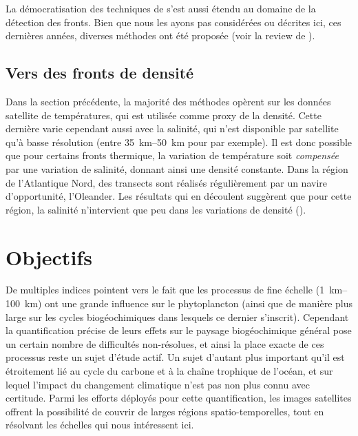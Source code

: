 \begin{note}
  La démocratisation des techniques de  s'est aussi étendu au domaine de la détection des fronts.
  Bien que nous les ayons pas considérées ou décrites ici, ces dernières années, diverses méthodes ont été proposée (voir la review de \cite{liu_2022}).
\end{note}

\subsection{Vers des fronts de densité}

Dans la section précédente, la majorité des méthodes opèrent sur les données satellite de températures, qui est utilisée comme proxy de la densité.
Cette dernière varie cependant aussi avec la salinité, qui n'est disponible par satellite qu'à basse résolution (entre \qtyrange[range-phrase={ et }]{35}{50}{\km} pour  par exemple).
Il est donc possible que pour certains fronts thermique, la variation de température soit \emph{compensée} par une variation de salinité, donnant ainsi une densité constante.
Dans la région de l'Atlantique Nord, des transects sont réalisés régulièrement par un navire d'opportunité, l'Oleander.
Les résultats qui en découlent suggèrent que pour cette région, la salinité n'intervient que peu dans les variations de densité (\cite{flagg_2006}).


\section{Objectifs}
\label{sec:problematique}

De multiples indices pointent vers le fait que les processus de fine échelle \OM(\qtyrange{1}{100}{\km}) ont une grande influence sur le phytoplancton (ainsi que de manière plus large sur les cycles biogéochimiques dans lesquels ce dernier s'inscrit).
Cependant la quantification précise de leurs effets sur le paysage biogéochimique général pose un certain nombre de difficultés non-résolues, et ainsi la place exacte de ces processus reste un sujet d'étude actif.
Un sujet d'autant plus important qu'il est étroitement lié au cycle du carbone et à la chaîne trophique de l'océan, et sur lequel l'impact du changement climatique n'est pas non plus connu avec certitude.
Parmi les efforts déployés pour cette quantification, les images satellites offrent la possibilité de couvrir de larges régions spatio-temporelles, tout en résolvant les échelles qui nous intéressent ici.


